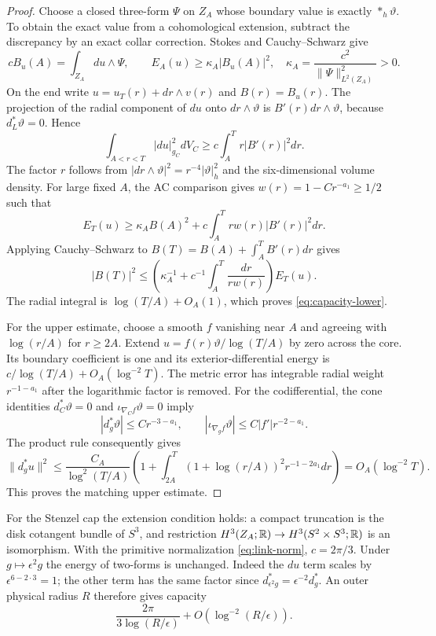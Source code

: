 \begin{proof}
Choose a closed three-form $\Psi$ on $Z_A$ whose boundary value is
exactly $*_h\vartheta$. To obtain the exact value from a cohomological
extension, subtract the discrepancy by an exact collar correction.
Stokes and Cauchy--Schwarz give
\[
 cB_u(A)=\int_{Z_A}du\wedge\Psi,\qquad
 E_A(u)\ge\kappa_A|B_u(A)|^2,
 \quad \kappa_A=\frac{c^2}{\|\Psi\|_{L^2(Z_A)}^2}>0.
\]
On the end write $u=u_T(r)+dr\wedge v(r)$ and $B(r)=B_u(r)$.
The projection of the radial component of $du$ onto
$dr\wedge\vartheta$ is $B'(r)dr\wedge\vartheta$, because
$d_L^*\vartheta=0$. Hence
\[
 \int_{A<r<T}|du|_{g_C}^2dV_C\ge c\int_A^Tr|B'(r)|^2dr.
\]
The factor $r$ follows from $|dr\wedge\vartheta|^2=r^{-4}|\vartheta|_h^2$
and the six-dimensional volume density. For large fixed $A$, the AC
comparison gives $w(r)=1-Cr^{-a_1}\ge1/2$ such that
\[
 E_T(u)\ge\kappa_AB(A)^2+c\int_A^Trw(r)|B'(r)|^2dr.
\]
Applying Cauchy--Schwarz to $B(T)=B(A)+\int_A^TB'(r)dr$ gives
\[
 |B(T)|^2\le
 \left(\kappa_A^{-1}+c^{-1}\int_A^T\frac{dr}{rw(r)}\right)E_T(u).
\]
The radial integral is $\log(T/A)+O_A(1)$, which proves
\eqref{eq:capacity-lower}.

For the upper estimate, choose a smooth $f$ vanishing near $A$ and
agreeing with $\log(r/A)$ for $r\ge2A$. Extend
$u=f(r)\vartheta/\log(T/A)$ by zero across the core. Its boundary
coefficient is one and its exterior-differential energy is
$c/\log(T/A)+O_A(\log^{-2}T)$. The metric error has integrable
radial weight $r^{-1-a_1}$ after the logarithmic factor is removed.
For the codifferential, the cone identities
$d_C^*\vartheta=0$ and $\iota_{\nabla_Cf}\vartheta=0$ imply
\[
 |d_g^*\vartheta|\le Cr^{-3-a_1},\qquad
 |\iota_{\nabla_gf}\vartheta|\le C|f'|r^{-2-a_1}.
\]
The product rule consequently gives
\[
 \|d_g^*u\|^2\le
 \frac{C_A}{\log^2(T/A)}
 \left(1+\int_{2A}^T(1+\log(r/A))^2r^{-1-2a_1}dr\right)
 =O_A(\log^{-2}T).
\]
This proves the matching upper estimate.
\end{proof}

For the Stenzel cap the extension condition holds: a compact truncation
is the disk cotangent bundle of $S^3$, and restriction
$H^3(Z_A;\mathbb R)\to H^3(S^2\times S^3;\mathbb R)$ is an isomorphism.
With the primitive normalization \eqref{eq:link-norm}, $c=2\pi/3$.
Under $g\mapsto\epsilon^2g$ the energy of two-forms is unchanged.
Indeed the $du$ term scales by $\epsilon^{6-2\cdot3}=1$; the other
term has the same factor since $d^*_{\epsilon^2g}=\epsilon^{-2}d_g^*$.
An outer physical radius $R$ therefore gives capacity
\begin{equation}\label{eq:scaled-capacity}
 \frac{2\pi}{3\log(R/\epsilon)}+O(\log^{-2}(R/\epsilon)).
\end{equation}

